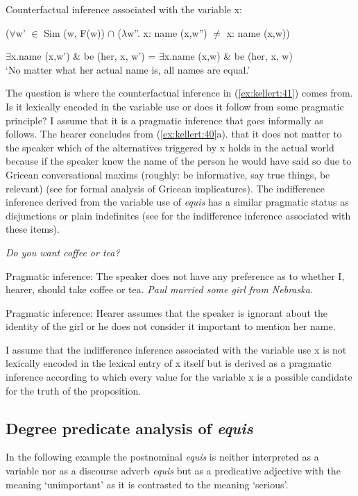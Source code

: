 \documentclass[output=paper]{langsci/langscibook}
\begin{document}
\ea\label{ex:kellert:41}
Counterfactual inference associated with the variable x:\par
($\forall$w’ $\in$ Sim (w, F(w)) $\cap$ ($\lambda$w”. x: name (x,w”) $≠$ x: name (x,w)) \par
$\exists$x.name (x,w’) \& be (her, x, w’) = $\exists$x.name (x,w) \& be (her, x, w)\\
\glt ‘No matter what her actual name is, all names are equal.’
\z

The question is where the counterfactual inference in (\ref{ex:kellert:41}) comes from. Is it lexically encoded in the variable use or does it follow from some pragmatic principle? I assume that it is a pragmatic inference that goes informally as follows. The hearer concludes from (\ref{ex:kellert:40}a). that it does not matter to the speaker which of the alternatives triggered by x holds in the actual world because if the speaker knew the name of the person he would have said so due to Gricean conversational maxims (roughly: be informative, say true things, be relevant) (see \citealt{Aloni2005} for formal analysis of Gricean implicatures). The indifference inference derived from the variable use of \textit{equis} has a similar pragmatic status as disjunctions or plain indefinites (see \citealt{Aloni2005} for the indifference inference associated with these items).

\ea\label{ex:kellert:42} \textit{Do you want coffee or tea?}
\par
Pragmatic inference: The speaker does not have any preference as to whether I, hearer, should take coffee or tea.
\ex  \textit{Paul married some girl from Nebraska.}
\par
Pragmatic inference: Hearer assumes that the speaker is ignorant about the 	identity of the girl or he does not consider it important to mention her name.
\z

I assume that the indifference inference associated with the variable use x is not lexically encoded in the lexical entry of x itself but is derived as a pragmatic inference according to which every value for the variable x is a possible candidate for the truth of the proposition.

\subsection{Degree predicate analysis of \textit{equis}}\label{sec:kellert:3.3}
In the following example the postnominal \textit{equis} is neither interpreted as a variable nor as a discourse adverb \textit{equis} but as a predicative adjective with the meaning ‘unimportant’ as it is contrasted to the meaning ‘serious’.
\end{document}
